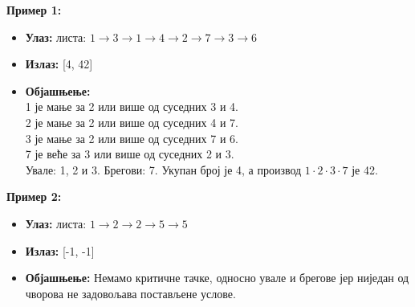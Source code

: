 \textbf{Пример 1:}
\begin{itemize}
    \item \textbf{Улаз:} листа: $1 \to 3 \to 1 \to 4 \to 2 \to 7 \to 3 \to 6$
    \item \textbf{Излаз:} [4, 42]
    \item \textbf{Објашњење:} \\
    1 је мање за 2 или више од суседних 3 и 4. \\
    2 је мање за 2 или више од суседних 4 и 7. \\
    3 је мање за 2 или више од суседних 7 и 6. \\
    7 је веће за 3 или више од суседних 2 и 3. \\
    Увале: 1, 2 и 3. Брегови: 7. Укупан број је 4, а производ $1 \cdot 2 \cdot 3 \cdot 7$ је 42.
\end{itemize}

\textbf{Пример 2:}
\begin{itemize}
    \item \textbf{Улаз:} листа: $1 \to 2 \to 2 \to 5 \to 5$
    \item \textbf{Излаз:} [-1, -1]
    \item \textbf{Објашњење:} Немамо критичне тачке, односно увале и брегове јер ниједан од чворова не задовољава постављене услове.
\end{itemize}

